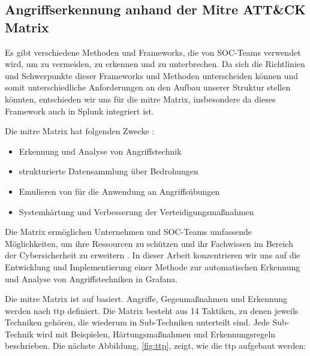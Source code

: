 \subsection{Angriffserkennung anhand der Mitre ATT\&CK Matrix}
Es gibt verschiedene Methoden und Frameworks, die von \gls{SOC}-Teams verwendet wird, um  zu vermeiden, zu erkennen und zu unterbrechen.  Da sich die Richtlinien und Schwerpunkte dieser Frameworks und Methoden unterscheiden können und somit unterschiedliche Anforderungen an den Aufbau unserer Struktur stellen könnten, entschieden wir uns für die \gls{mitre} Matrix, insbesondere da dieses Framework auch in Splunk integriert ist.

Die \gls{mitre} Matrix hat folgenden Zwecke \citep{Mitre_Started}:

{
\begin{itemize}[noitemsep]
   \item Erkennung und Analyse von Angriffstechnik
   \item	strukturierte Datensammlung über Bedrohungen
   \item	Emulieren von  für die Anwendung an Angriffsübungen
   \item	Systemhärtung und Verbesserung der Verteidigungsmaßnahmen
\end{itemize}
}

Die Matrix ermöglichen Unternehmen und \gls{SOC}-Teams umfassende Möglichkeiten, um ihre Ressourcen zu schützen und ihr Fachwissen im Bereich der \gls{Cybersicherheit} zu erweitern \citep{Hazel_howtousemitre}. In dieser Arbeit konzentrieren wir uns auf die Entwicklung und Implementierung einer Methode zur automatischen Erkennung und Analyse von Angriffstechniken in Grafana.

Die \gls{mitre} Matrix ist auf  basiert. Angriffe, Gegenmaßnahmen und Erkennung werden nach \gls{ttp} definiert. Die Matrix besteht aus 14 Taktiken, zu denen jeweils Techniken gehören, die wiederum in Sub-Techniken unterteilt sind. Jede Sub-Technik wird mit Beispielen, Härtungsmaßnahmen und Erkennungsregeln beschrieben. Die nächste Abbildung, \ref{fig:ttp}, zeigt, wie die \gls{ttp} aufgebaut werden:

